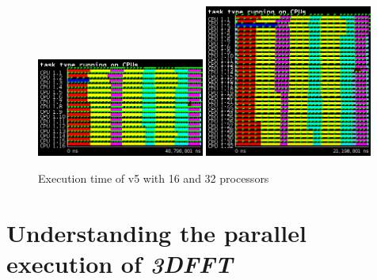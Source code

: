 \begin{figure}[H]%
    \label{fig:plot_v5_16}
    \centering
    \includegraphics[width=0.49\textwidth]{./data/3dfft_/plots/v5_16.png}
    \includegraphics[width=0.49\textwidth]{./data/3dfft_/plots/v5_32.png}
    \caption{Execution time of v5 with 16 and 32 processors}%
\end{figure}





\section{Understanding the parallel execution of \emph{3DFFT}}%
\label{sec:understanding_the_parallel_execution_of_3dfft}


